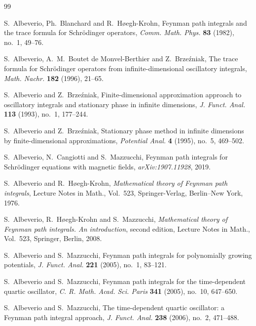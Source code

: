 \documentclass[11pt]{amsart}
\theoremstyle{plain}
\theoremstyle{definition}
\theoremstyle{remark}
\begin{document}
\begin{thebibliography}{99}

S.~Albeverio, Ph.~Blanchard and R.~H{\o}egh-Krohn,
Feynman path integrals and the trace formula for Schr\"odinger operators,
\emph{Comm. Math. Phys.} \textbf{83} (1982), no.~1, 49--76.

S.~Albeverio, A.~M.~Boutet de Monvel-Berthier and Z.~Brze\'zniak,
The trace formula for Schr\"odinger operators from infinite-dimensional
oscillatory integrals,
\emph{Math. Nachr.} \textbf{182} (1996), 21--65.

S.~Albeverio and Z.~Brze\'zniak,
Finite-dimensional approximation approach to oscillatory integrals and
stationary phase in infinite dimensions,
\emph{J. Funct. Anal.} \textbf{113} (1993), no.~1, 177--244.

S.~Albeverio and Z.~Brze\'zniak,
Stationary phase method in infinite dimensions by finite-dimensional
approximations,
\emph{Potential Anal.} \textbf{4} (1995), no.~5, 469--502.

S.~Albeverio, N.~Cangiotti and S.~Mazzucchi,
Feynman path integrals for Schr\"odinger equations with magnetic fields,
\emph{arXiv:1907.11928}, 2019.

S.~Albeverio and R.~H{\o}egh-Krohn,
\emph{Mathematical theory of Feynman path integrals},
Lecture Notes in Math., Vol.~523,
Springer-Verlag, Berlin--New York, 1976.

S.~Albeverio, R.~H{\o}egh-Krohn and S.~Mazzucchi,
\emph{Mathematical theory of Feynman path integrals. An introduction},
second edition,
Lecture Notes in Math., Vol.~523,
Springer, Berlin, 2008.

S.~Albeverio and S.~Mazzucchi,
Feynman path integrals for polynomially growing potentials,
\emph{J. Funct. Anal.} \textbf{221} (2005), no.~1, 83--121.

S.~Albeverio and S.~Mazzucchi,
Feynman path integrals for the time-dependent quartic oscillator,
\emph{C. R. Math. Acad. Sci. Paris} \textbf{341} (2005), no.~10,
647--650.

S.~Albeverio and S.~Mazzucchi,
The time-dependent quartic oscillator: a Feynman path integral approach,
\emph{J. Funct. Anal.} \textbf{238} (2006), no.~2, 471--488.


\end{thebibliography}
\end{document}
